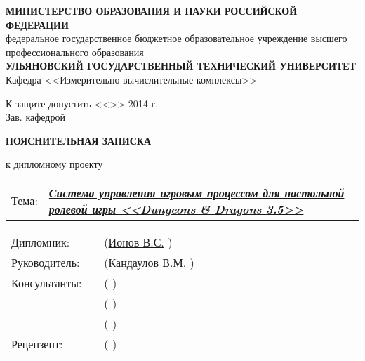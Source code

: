 \begin{titlepage}



\small
\begin{center}

\MakeTextUppercase{\textbf{министерство образования и науки российской федерации}}\\
федеральное государственное бюджетное образовательное учреждение высшего профессионального образования\\
\MakeTextUppercase{\textbf{ульяновский государственный технический университет}}\\[0.7cm]

Кафедра <<Измерительно-вычислительные комплексы>>\\[0.7cm]

\begin{flushright}

К защите допустить <<\underline{\hspace{1cm}}>>\underline{\hspace{2.5cm}} 2014 г.\\
Зав. кафедрой \underline{\hspace{3.5cm}}

\end{flushright}

\vspace{1.5cm}

\LARGE

\textbf{ПОЯСНИТЕЛЬНАЯ ЗАПИСКА}

\Large

к дипломному проекту\\[0.7cm]

\normalsize

\begin{tabular}{p{1cm} p{13.5cm}}
Тема: & \textbf{\textit{\uline{Система управления игровым процессом для настольной ролевой игры <<Dungeons \& Dragons 3.5>>\hfill}}}
\end{tabular}

\vspace{2cm}

\begin{tabular}{m{3cm} m{6cm} m{5cm}}
    Дипломник:    & \uline{\hfill} & (\uline{Ионов В.С.\hfill}     )  \\[0.5cm]
    Руководитель: & \uline{\hfill} & (\uline{Кандаулов В.М.\hfill} )  \\[0.5cm]
    Консультанты: & \uline{\hfill} & (\uline{\hfill}               )  \\[0.5cm]
                  & \uline{\hfill} & (\uline{\hfill}               )  \\[0.5cm]
                  & \uline{\hfill} & (\uline{\hfill}               )  \\[0.5cm]
    Рецензент:    & \uline{\hfill} & (\uline{\hfill}               )  \\
\end{tabular}


\end{center}
\end{titlepage}
